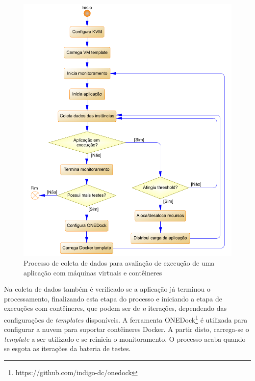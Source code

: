 \documentclass[twoside,english,brazilian]{UNISINOSartigo}
\begin{document}
\begin{figure}[h!]
	\caption{Processo de coleta de dados para avaliação de execução de uma aplicação com máquinas virtuais e contêineres}
	\label{fig:flow}
	\centering%
	\vspace{-0.75\baselineskip}
	\begin{minipage}{0.9\textwidth}
		\includegraphics[width=\textwidth]{images/flow_onedock}
	\end{minipage}
\end{figure}

Na coleta de dados também é verificado se a aplicação já terminou o processamento, finalizando esta etapa do processo e iniciando a etapa de execuções com contêineres, que podem ser de \textit{n} iterações, dependendo das configurações de \textit{templates} disponíveis. A ferramenta ONEDock\footnote{https://github.com/indigo-dc/onedock} é utilizada para configurar a nuvem para suportar contêineres Docker. A partir disto, carrega-se o \textit{template} a ser utilizado e se reinicia o monitoramento. O processo acaba quando se esgota as iterações da bateria de testes.
\end{document}
